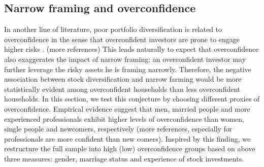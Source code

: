 \documentclass[ukenglish,nottitlepage,thmsb,11pt,letterpaper]{article}
\begin{document}
\subsection{Narrow framing and overconfidence}

In another line of  literature, poor portfolio diversification is related to overconfidence in the sense that overconfident investors are prone to engage higher risks \citep{Barber2001,Fuertes2014}. {\color{red}(more references)} This leads naturally to expect that overconfidence also exaggerates the impact of narrow framing: an overconfident investor may further leverage the risky assets he is framing narrowly. Therefore, the negative association between stock diversification and narrow farming would be more statistically evident among overconfident households than less overconfident households. In this section, we test this conjecture by choosing different proxies of overconfidence.  Empirical evidence suggest that men, married people and more experienced professionals exhibit higher levels of overconfidence than women, single people and newcomers, respectively  \citep[e.g., ][]{GRINBLATT2009,GRINBLATT2011} {\color{red}(more references, especially for professionals are more confident than new comers)}. Inspired by this finding,  we restructure the full sample into high (low) overconfidence groups based on above three measures: gender, marriage status and experience of stock investments. 
\end{document}
